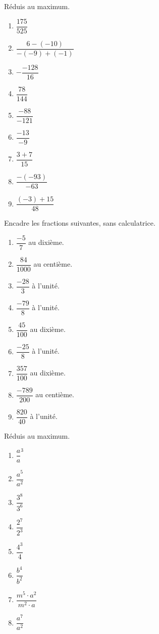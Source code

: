 \documentclass[12pt,parskip=half-, twoside=semi]{scrartcl}
\begin{document}
\setcounter{exercise}{0}

\begin{exercise}
  Réduis au maximum.
  \begin{enumerate}[cols=3]
   \item $\dfrac{175}{525}$
   \item $\dfrac{6-(-10)}{-(-9)+(-1)}$
   \item $-\dfrac{- 128}{16}$
   \item $\dfrac{78}{144}$
   \item $\dfrac{- 88}{- 121}$
   \item $\dfrac{- 13}{- 9}$
   \item $\dfrac{3 + 7}{15}$
   \item $\dfrac{- ( - 93)}{- 63}$
   \item $\dfrac{( - 3) + 15}{48}$
  \end{enumerate}
\end{exercise}

\begin{exercise}
  Encadre les fractions suivantes, sans calculatrice.
  \begin{enumerate}[cols=3]
    \item $\dfrac{-5}{7}$ au dixième.
    \item $\dfrac{84}{1000}$ au centième.
    \item $\dfrac{-28}{3}$ à l'unité.
    \item $\dfrac{-79}{8}$ à l'unité.
    \item $\dfrac{45}{100}$ au dixième.
    \item $\dfrac{-25}{8}$ à l'unité.
    \item $\dfrac{357}{100}$ au dixième.
    \item $\dfrac{-789}{200}$ au centième.
    \item $\dfrac{820}{40}$ à l'unité.
  \end{enumerate}
\end{exercise}

\begin{exercise}
  Réduis au maximum.
  \begin{enumerate}[cols=4]
    \item \(\dfrac{a}{a}^{3} \)
    \item \(\dfrac{a^{5}}{a^{2}} \)
    \item \(\dfrac{3^{8}}{3^{6}} \)
    \item \(\dfrac{2^{7}}{2^{3}} \)
    \item \(\dfrac{4^{3}}{4} \)
    \item \(\dfrac{b^{4}}{b^{2}} \)
    \item \(\dfrac{m^{5} \cdot a^{2}}{m^{2} \cdot a}\)
    \item \(\dfrac{a^{7}}{a^{2}}\)

  \end{enumerate}
\end{exercise}
\end{document}

